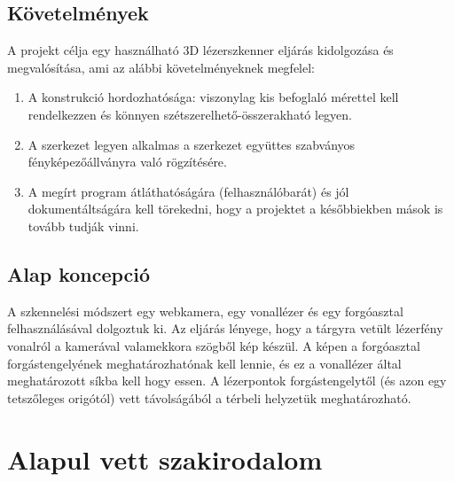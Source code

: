 \documentclass[12pt,a4paper]{article}
\begin{document}
\subsection{Követelmények}
A projekt célja egy használható 3D lézerszkenner eljárás kidolgozása és megvalósítása, ami az alábbi követelményeknek megfelel:
\begin{enumerate}
	\item A konstrukció hordozhatósága: viszonylag kis befoglaló mérettel kell 			rendelkezzen és könnyen szétszerelhető-összerakható legyen.\label{hordozhatosag}
	\item A szerkezet legyen alkalmas a szerkezet együttes szabványos fényképezőállványra való rögzítésére.\label{kameraallvanyra}
	\item A megírt program átláthatóságára (felhasználóbarát) és jól dokumentáltságára kell törekedni, hogy a projektet a későbbiekben mások is tovább tudják vinni.\label{felhasznalobarat}
\end{enumerate}
\subsection{Alap koncepció}
A szkennelési módszert egy webkamera, egy vonallézer és egy forgóasztal felhasználásával dolgoztuk ki. Az eljárás lényege, hogy a tárgyra vetült lézerfény vonalról a kamerával valamekkora szögből kép készül. A képen a forgóasztal forgástengelyének meghatározhatónak kell lennie, és ez a vonallézer által meghatározott síkba kell hogy essen. A lézerpontok forgástengelytől (és azon egy tetszőleges origótól) vett távolságából a térbeli helyzetük meghatározható.
\section{Alapul vett szakirodalom} %
	
\end{document}
